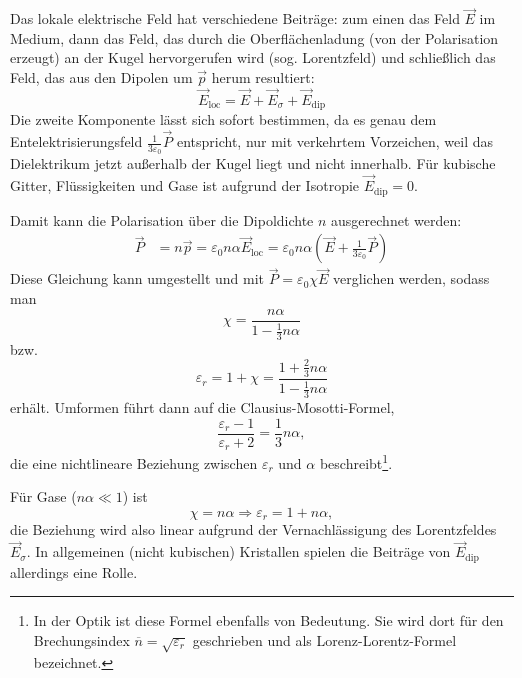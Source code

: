 Das lokale elektrische Feld hat verschiedene Beiträge: zum einen das Feld $\vec {E}$ im Medium, dann das Feld, das durch die Oberflächenladung (von der Polarisation erzeugt) an der Kugel hervorgerufen wird (sog. Lorentzfeld) und schließlich das Feld, das aus den Dipolen um $\vec {p}$ herum resultiert:
\begin{equation*}
	\vec {E}_{\mathrm{loc}}=\vec {E}+\vec {E}_{\sigma }+\vec {E}_{\mathrm{dip}}
\end{equation*}
Die zweite Komponente lässt sich sofort bestimmen, da es genau dem Entelektrisierungsfeld $\frac{1}{3\varepsilon _{0}}\vec {P}$ entspricht, nur mit verkehrtem Vorzeichen, weil das Dielektrikum jetzt außerhalb der Kugel liegt und nicht innerhalb. Für kubische Gitter, Flüssigkeiten und Gase ist aufgrund der Isotropie $\vec {E}_{\mathrm{dip}}=0$.

Damit kann die Polarisation über die Dipoldichte $n$ ausgerechnet werden:
\begin{equation*}
	\begin{array}{rr}
		\vec {P} & =n\vec {p}=\varepsilon _{0}n\alpha \vec {E}_{\mathrm{loc}}=\varepsilon _{0}n\alpha \left(\vec {E}+\frac{1}{3\varepsilon _{0}}\vec {P}\right)
	\end{array}
\end{equation*}
Diese Gleichung kann umgestellt und mit $\vec {P}=\varepsilon _{0}\chi \vec {E}$ verglichen werden, sodass man
\begin{equation*}
	\chi =\frac{n\alpha }{1-\frac{1}{3}n\alpha }
\end{equation*}
bzw.
\begin{equation*}
	\varepsilon _{r}=1+\chi =\frac{1+\frac{2}{3}n\alpha }{1-\frac{1}{3}n\alpha }
\end{equation*}
erhält. Umformen führt dann auf die Clausius-Mosotti-Formel,
\begin{equation*}
	\frac{\varepsilon _{r}-1}{\varepsilon _{r}+2}=\frac{1}{3}n\alpha ,
\end{equation*}
die eine nichtlineare Beziehung zwischen $\varepsilon _{r}$ und $\alpha $ beschreibt\footnote{In der Optik ist diese Formel ebenfalls von Bedeutung. Sie wird dort für den Brechungsindex $\overline{n}=\sqrt{\varepsilon _{r}}$ geschrieben und als Lorenz-Lorentz-Formel bezeichnet. }.

Für Gase ($n\alpha \ll 1$) ist
\begin{equation*}
	\chi =n\alpha \Rightarrow \varepsilon _{r}=1+n\alpha ,
\end{equation*}
die Beziehung wird also linear aufgrund der Vernachlässigung des Lorentzfeldes $\vec {E}_{\sigma }$. In allgemeinen (nicht kubischen) Kristallen spielen die Beiträge von $\vec {E}_{\mathrm{dip}}$ allerdings eine Rolle.

